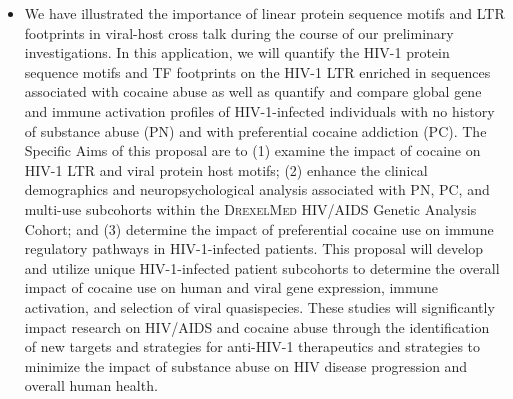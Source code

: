 \documentclass[a4paper,11pt]{article}
\makeatletter
\newenvironment{fullwidth}
    {\par
     \setlength{\@totalleftmargin}{0pt}%
     \setlength{\linewidth}{\hsize}%
     \list{}{\setlength{\leftmargin}{0pt}}
     \item\relax}
    {\endlist}
\makeatother
\begin{document}
\begin{enumerate}
\begin{itemize}
\begin{fullwidth}
We have illustrated the importance of linear protein sequence motifs and LTR footprints in viral-host cross talk during the course of our preliminary investigations. 
In this application, we will quantify the HIV-1 protein sequence motifs and TF footprints on the HIV-1 LTR enriched in sequences associated with cocaine abuse as well as quantify and compare global gene and immune activation profiles of HIV-1-infected individuals with no history of substance abuse (PN) and with preferential cocaine addiction (PC). 
The Specific Aims of this proposal are to (1) examine the impact of cocaine on HIV-1 LTR and viral protein host motifs; (2) enhance the clinical demographics and neuropsychological analysis associated with PN, PC, and multi-use subcohorts within the \textsc{DrexelMed} HIV/AIDS Genetic Analysis Cohort; and (3) determine the impact of preferential cocaine use on immune regulatory pathways in HIV-1-infected patients. 
This proposal will develop and utilize unique HIV-1-infected patient subcohorts to determine the overall impact of cocaine use on human and viral gene expression, immune activation, and selection of viral quasispecies. 
These studies will significantly impact research on HIV/AIDS and cocaine abuse through the identification of new targets and strategies for anti-HIV-1 therapeutics and strategies to minimize the impact of substance abuse on HIV disease progression and overall human health.
   \end{fullwidth}


\end{itemize}
\end{enumerate}
\end{document}
